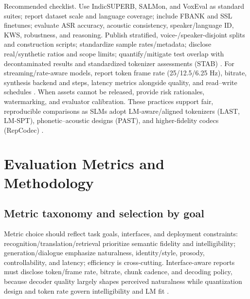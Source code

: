 Recommended checklist. Use IndicSUPERB, SALMon, and VoxEval as standard suites; report dataset scale and language coverage; include FBANK and SSL finetunes; evaluate ASR accuracy, acoustic consistency, speaker/language ID, KWS, robustness, and reasoning. Publish stratified, voice-/speaker-disjoint splits and construction scripts; standardize sample rates/metadata; disclose real/synthetic ratios and scope limits; quantify/mitigate test overlap with decontaminated results and standardized tokenizer assessments (STAB) \cite{vashishth2024stabspeechtokenizerassessmentbenchmark}. For streaming/rate-aware models, report token frame rate (25/12.5/6.25 Hz), bitrate, synthesis backend and steps, latency metrics alongside quality, and read–write schedules \cite{zhang2025impactframeratesspeechtokenizercasestudy}. When assets cannot be released, provide risk rationales, watermarking, and evaluator calibration. These practices support fair, reproducible comparisons as SLMs adopt LM‑aware/aligned tokenizers (LAST, LM‑SPT), phonetic–acoustic designs (PAST), and higher-fidelity codecs (RepCodec) \cite{turetzky2024lastlanguagemodelawarespeechtokenization,jo2025lmsptalignedsemanticdistillationspeechto,har-tuv2025pastphoneticacousticspeechtokenizer,huang2024repcodecspeechrepresentationcodectokeniz}.

















\section{Evaluation Metrics and Methodology} \label{sec:Evaluation Metrics and Methodology}

\subsection{Metric taxonomy and selection by goal} \label{subsec:Metric taxonomy and selection by goal}
Metric choice should reflect task goals, interfaces, and deployment constraints: recognition/translation/retrieval prioritize semantic fidelity and intelligibility; generation/dialogue emphasize naturalness, identity/style, prosody, controllability, and latency; efficiency is cross-cutting. Interface-aware reports must disclose token/frame rate, bitrate, chunk cadence, and decoding policy, because decoder quality largely shapes perceived naturalness while quantization design and token rate govern intelligibility and LM fit \cite{turetzky2024lastlanguagemodelawarespeechtokenization,zhang2025impactframeratesspeechtokenizercasestudy,li2024investigatingneuralaudiocodecsspeechlang}.

